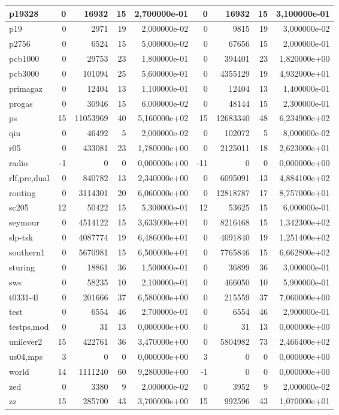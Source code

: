 \begin{tabular}{|l|r|r|r|r|r|r|r|r|}
p19328 & 0 & 16932 & 15 & 2,700000e-01 & 0 & 16932 & 15 & 3,100000e-01 \\ \hline
p19 & 0 & 2971 & 19 & 2,000000e-02 & 0 & 9815 & 19 & 3,000000e-02 \\ \hline
p2756 & 0 & 6524 & 15 & 5,000000e-02 & 0 & 67656 & 15 & 2,000000e-01 \\ \hline
pcb1000 & 0 & 29753 & 23 & 1,800000e-01 & 0 & 394401 & 23 & 1,820000e+00 \\ \hline
pcb3000 & 0 & 101094 & 25 & 5,600000e-01 & 0 & 4355129 & 19 & 4,932000e+01 \\ \hline
primagaz & 0 & 12404 & 13 & 1,100000e-01 & 0 & 12404 & 13 & 1,400000e-01 \\ \hline
progas & 0 & 30946 & 15 & 6,000000e-02 & 0 & 48144 & 15 & 2,300000e-01 \\ \hline
ps & 15 & 11053969 & 40 & 5,160000e+02 & 15 & 12683340 & 48 & 6,234900e+02 \\ \hline
qiu & 0 & 46492 & 5 & 2,000000e-02 & 0 & 102072 & 5 & 8,000000e-02 \\ \hline
r05 & 0 & 433081 & 23 & 1,780000e+00 & 0 & 2125011 & 18 & 2,623000e+01 \\ \hline
radio & -1 & 0 & 0 & 0,000000e+00 & -11 & 0 & 0 & 0,000000e+00 \\ \hline
rlf,pre,dual & 0 & 840782 & 13 & 2,340000e+00 & 0 & 6095091 & 13 & 4,884100e+02 \\ \hline
routing & 0 & 3114301 & 20 & 6,060000e+00 & 0 & 12818787 & 17 & 8,757000e+01 \\ \hline
sc205 & 12 & 50422 & 15 & 5,300000e-01 & 12 & 53625 & 15 & 6,000000e-01 \\ \hline
seymour & 0 & 4514122 & 15 & 3,633000e+01 & 0 & 8216468 & 15 & 1,342300e+02 \\ \hline
slp-tsk & 0 & 4087774 & 19 & 6,486000e+01 & 0 & 4091840 & 19 & 1,251400e+02 \\ \hline
southern1 & 0 & 5670981 & 15 & 6,500000e+01 & 0 & 7765846 & 15 & 6,662800e+02 \\ \hline
sturing & 0 & 18861 & 36 & 1,500000e-01 & 0 & 36899 & 36 & 3,000000e-01 \\ \hline
sws & 0 & 58235 & 10 & 2,100000e-01 & 0 & 466050 & 10 & 5,900000e-01 \\ \hline
t0331-4l & 0 & 201666 & 37 & 6,580000e+00 & 0 & 215559 & 37 & 7,060000e+00 \\ \hline
test & 0 & 6554 & 46 & 2,700000e-01 & 0 & 6554 & 46 & 2,900000e-01 \\ \hline
testps,mod & 0 & 31 & 13 & 0,000000e+00 & 0 & 31 & 13 & 0,000000e+00 \\ \hline
unilever2 & 15 & 422761 & 36 & 3,470000e+00 & 0 & 5804982 & 73 & 2,466400e+02 \\ \hline
us04,mps & 3 & 0 & 0 & 0,000000e+00 & 3 & 0 & 0 & 0,000000e+00 \\ \hline
world & 14 & 1111240 & 60 & 9,280000e+00 & -1 & 0 & 0 & 0,000000e+00 \\ \hline
zed & 0 & 3380 & 9 & 2,000000e-02 & 0 & 3952 & 9 & 2,000000e-02 \\ \hline
zz & 15 & 285700 & 43 & 3,700000e+00 & 15 & 992596 & 43 & 1,070000e+01 \\ \hline
\end{tabular}
